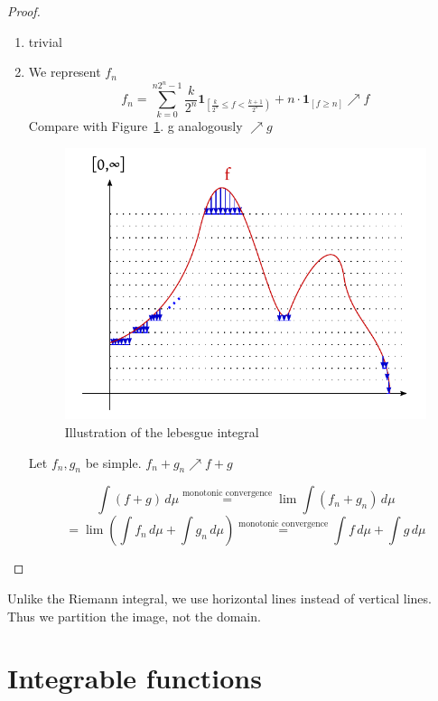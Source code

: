 \documentclass[a4paper]{article}
\numberwithin{lecref}{section}
\theoremstyle{break}
\begin{document}
\begin{proof}
  \begin{enumerate}
    \item trivial
    \item We represent $f_n$
      \[
        f_n
          = \sum_{k=0}^{n2^n - 1} \frac{k}{2^n} \mathbf{1}_{\left[\frac{k}{2^n} \leq f < \frac{k+1}{2^n}\right)}
          + n \cdot \mathbf{1}_{[f \geq n]} \nearrow f
      \]
      Compare with Figure~\ref{img:lebesgue}.
      g analogously $\nearrow g$

      \begin{figure}[!ht]
        \begin{center}
          \includegraphics{img/02_lebesgue_integral.pdf}
          \caption{Illustration of the lebesgue integral}
          \label{img:lebesgue}
        \end{center}
      \end{figure}

      Let $f_n, g_n$ be simple.
      $f_n + g_n \nearrow f + g$

      \[ \int (f + g) \, d\mu \overset{\text{monotonic convergence}}{=} \lim \int (f_n + g_n) \, d\mu \]
      \[ = \lim(\int f_n \, d\mu + \int g_n \, d\mu) \overset{\text{monotonic convergence}}{=} \int f \, d\mu + \int g \, d\mu \]
  \end{enumerate}
\end{proof}

Unlike the Riemann integral, we use horizontal lines instead of vertical lines.
Thus we partition the image, not the domain.

\section{Integrable functions}
\end{document}
